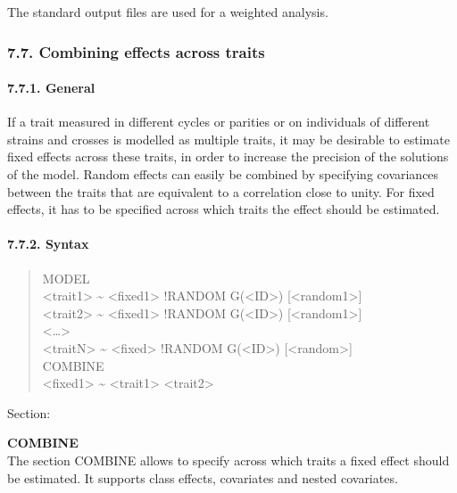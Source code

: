 The standard output files are used for a weighted analysis.

\subsubsection{7.7. Combining effects across traits}\label{Stat33}

\paragraph{7.7.1. General}\label{Stat34}

If a trait measured in different cycles or parities or on individuals of
different strains and crosses is modelled as multiple traits, it may be
desirable to estimate fixed effects across these traits, in order to
increase the precision of the solutions of the model. Random effects can
easily be combined by specifying covariances between the traits that are
equivalent to a correlation close to unity. For fixed effects, it has to
be specified across which traits the effect should be estimated.

\paragraph{7.7.2. Syntax}\label{Stat35}

\begin{quote}
MODEL\\
\textless trait1\textgreater{} \textasciitilde{}
\textless fixed1\textgreater{} !RANDOM G(\textless ID\textgreater)
{[}\textless random1\textgreater{]}\\
\textless trait2\textgreater{} \textasciitilde{}
\textless fixed1\textgreater{} !RANDOM G(\textless ID\textgreater)
{[}\textless random1\textgreater{]}\\
\textless\ldots\textgreater{}\\
\textless traitN\textgreater{} \textasciitilde{}
\textless fixed\textgreater{} !RANDOM G(\textless ID\textgreater)
{[}\textless random\textgreater{]}\\
COMBINE\\
\textless fixed1\textgreater{} \textasciitilde{}
\textless trait1\textgreater{} \textless trait2\textgreater{}
\end{quote}

Section:

\textbf{COMBINE}\\
The section COMBINE allows to specify across which traits a fixed effect
should be estimated. It supports class effects, covariates and nested
covariates.

